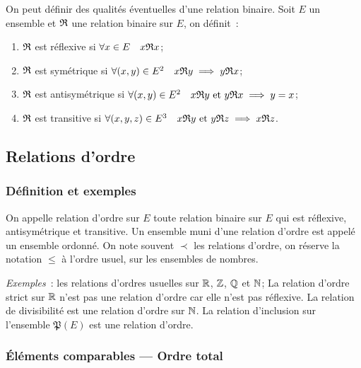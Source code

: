 \begin{defdef}
  On peut définir des qualités éventuelles d'une relation binaire. Soit \(E\)
  un ensemble et \(\mathfrak{R}{}\) une relation binaire sur \(E\), on définit~:
  \begin{enumerate}
    \item \(\mathfrak{R}{}\) est réflexive si \(\forall{}x \in{}E \quad
      x\mathfrak{R}{}x\);
    \item \(\mathfrak{R}{}\) est symétrique si \(\forall{}(x,y) \in{}E^2 \quad
      x\mathfrak{R}{}y \implies y\mathfrak{R}{}x\);
    \item \(\mathfrak{R}{}\) est antisymétrique si \(\forall{}(x,y) \in{}E^2 \quad
      x\mathfrak{R}{}y \text{~et~} y\mathfrak{R}{}x \implies y = x\);
    \item \(\mathfrak{R}{}\) est transitive si \(\forall{}(x,y,z) \in{}E^3 \quad
      x\mathfrak{R}{}y \text{~et~} y\mathfrak{R}{}z \implies x\mathfrak{R}{}z\).
  \end{enumerate}
\end{defdef}

\subsection{Relations d'ordre}\label{chap3-subsec:relationdordre}

\subsubsection{Définition et exemples}\label{chap3-subsubsec:relationordredef}

\begin{defdef}
  On appelle relation d'ordre sur \(E\) toute relation binaire sur \(E\) qui
  est réflexive, antisymétrique et transitive. Un ensemble muni d'une relation
  d'ordre est appelé un ensemble ordonné. On note souvent \(\prec\) les
  relations d'ordre, on réserve la notation \(\leqslant\) à l'ordre usuel, sur
  les ensembles de nombres.
\end{defdef}

\emph{Exemples}~: les relations d'ordres usuelles sur \(\mathbb{R}\), \(\mathbb{Z}\), \(\mathbb{Q}\) et
\(\mathbb{N}\); La relation d'ordre strict sur \(\mathbb{R}\) n'est pas une relation d'ordre car
elle n'est pas réflexive. La relation de divisibilité est une relation d'ordre
sur \(\mathbb{N}\). La relation d'inclusion sur l'ensemble \(\mathfrak{P}(E)\) est une
relation d'ordre.

\subsubsection{Éléments comparables --- Ordre total}\label{chap3-subsubsec:ordretotal}

